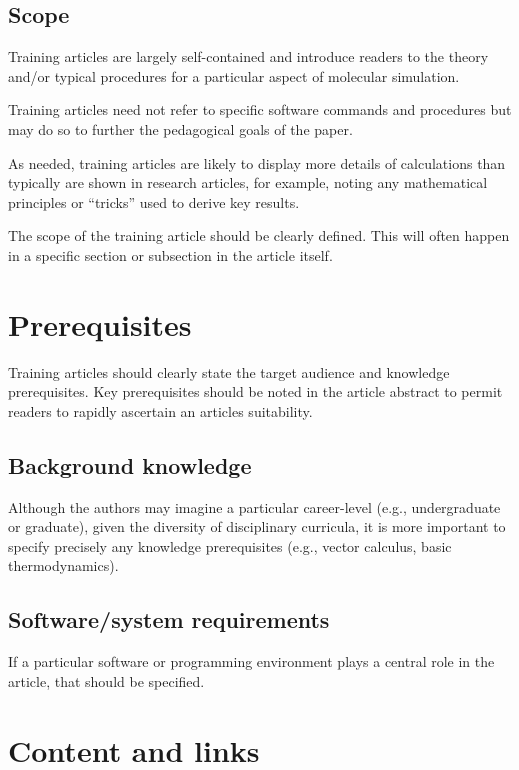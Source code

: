 \documentclass[9pt,training]{livecoms}
\begin{document}
\subsection{Scope}

Training articles are largely self-contained and introduce readers to the theory and/or typical procedures for a particular aspect of molecular simulation.

Training articles need not refer to specific software commands and procedures but may do so to further the pedagogical goals of the paper.

As needed, training articles are likely to display more details of calculations than typically are shown in research articles, for example, noting any mathematical principles or “tricks” used to derive key results.

The scope of the training article should be clearly defined.
This will often happen in a specific section or subsection in the article itself.

\section{Prerequisites}

Training articles should clearly state the target audience and knowledge prerequisites.
Key prerequisites should be noted in the article abstract to permit readers to rapidly ascertain an articles suitability.

\subsection{Background knowledge}

Although the authors may imagine a particular career-level (e.g., undergraduate or graduate), given the diversity of disciplinary curricula, it is more important to specify precisely any knowledge prerequisites (e.g., vector calculus, basic thermodynamics).

\subsection{Software/system requirements}

If a particular software or programming environment plays a central role in the article, that should be specified.

\section{Content and links}
\end{document}
